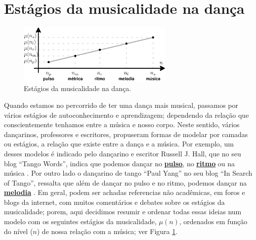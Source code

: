 
\newpage
\section{Estágios da musicalidade na dança}
\label{sec:aspectosusicalidade}

\begin{figure}
    \centering
    \includegraphics[width=0.675\textwidth]{chapters/cap-musicalidade-tecnica/temporallatex-aspectos-musica-latex.eps}
    \caption{Estágios da musicalidade na dança.}
    \label{fig:aspectos-musica-mu}
\end{figure}
Quando estamos no percorrido de ter uma dança mais musical,
passamos por vários estágios de autoconhecimento e aprendizagem; 
dependendo da relação que conscientemente tenhamos entre a música e nosso corpo.
Neste sentido, vários dançarinos, professores e escritores,
propuseram formas de modelar por camadas ou estágios, a relação que existe entre a dança e a música.
Por exemplo, um desses modelos é indicado pelo dançarino e escritor Russell J. Hall,
que no seu blog ``Tango Words'', 
indica que podemos dançar no \hyperref[ref:Pulso]{\textbf{pulso}}, 
no \hyperref[sec:pos:Ritmo]{\textbf{ritmo}} ou na música \cite{TangoWordsEstagiosMusicalidade1}.
Por outro lado o dançarino de tango ``Paul Yang'' no seu blog ``In Search of Tango'',
ressalta que além de dançar no pulso e no ritmo, 
podemos  dançar na \hyperref[sec:pos:Melodia]{\textbf{melodia}} \cite{InSearchOfTangoEstagiosMusicalidade1}.
Em geral, podem ser achadas referencias não acadêmicas, em foros e blogs da internet,
com muitos comentários e debates sobre os estágios da musicalidade;
porem, aqui decidimos resumir e ordenar todas essas ideias num modelo com os seguintes estágios da musicalidade, $\mu(n)$,
ordenados em função do nível ($n$) de nossa relação com a música; ver Figura \ref{fig:aspectos-musica-mu}.\\



